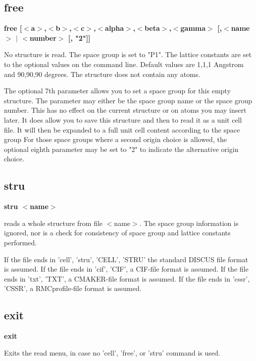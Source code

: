 \subsection*{free}
{\bf free [$ <$a$> $,$ <$b$> $,$ <$c$> $,$ <$alpha$> $,$ <$beta$> $,$ <$gamma$> $ [,$ <$name$> $ $| $ $ <$number$> $ [, "2"]] \par }
\par
\vspace{3pt}
No structure is read. The space group is set to "P1". The lattice 
constants are set to the optional values on the command line. 
Default values are 1,1,1 Angstrom and  90,90,90 degrees. 
The structure does not contain any atoms. 
\par
The optional 7th parameter allows you to set a space group for this 
empty structure. The parameter may either be the space group name or 
the space group number. This has no effect on the current structure 
or on atoms you may insert later. It does allow you to save this 
structure and then to read it as a unit cell file. It will then be 
expanded to a full unit cell content according to the space group 
For those space groups where a second origin choice is allowed, 
the optional eighth parameter may be set to "2" to indicate the 
alternative origin choice. 
\subsection*{stru}
{\bf stru $ <$name$> $ \par }
\par
\vspace{3pt}
reads a whole structure from file $ <$name$> $. 
The space group information is ignored, nor is a check for consistency 
of space group and lattice constants performed. 
\par
If the file ends in 'cell', 'stru', 'CELL', 'STRU' the standard 
DISCUS file format is assumed. 
If the file ends in 'cif', 'CIF', a CIF-file format is assumed. 
If the file ends in 'txt', 'TXT', a CMAKER-file format is assumed. 
If the file ends in 'cssr', 'CSSR', a RMCprofile-file format is assumed. 
\subsection*{exit}
{\bf exit \par }
\par
\vspace{3pt}
Exits the read menu, in case no 'cell', 'free', or 'stru' command 
is used. 
